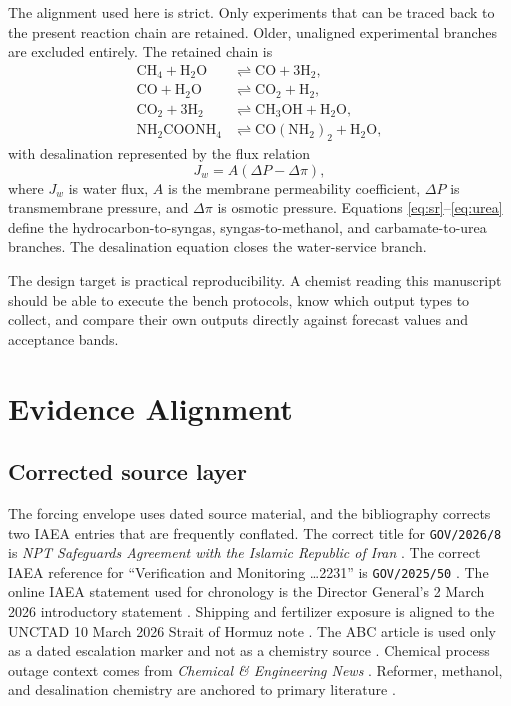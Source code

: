 \documentclass[11pt]{article}
\begin{document}
The alignment used here is strict. Only experiments that can be traced back to the present reaction chain are retained. Older, unaligned experimental branches are excluded entirely. The retained chain is
\begin{align}
\mathrm{CH_4 + H_2O} &\rightleftharpoons \mathrm{CO + 3H_2}, \label{eq:sr}\\
\mathrm{CO + H_2O} &\rightleftharpoons \mathrm{CO_2 + H_2}, \label{eq:wgs}\\
\mathrm{CO_2 + 3H_2} &\rightleftharpoons \mathrm{CH_3OH + H_2O}, \label{eq:meoh}\\
\mathrm{NH_2COONH_4} &\rightleftharpoons \mathrm{CO(NH_2)_2 + H_2O}, \label{eq:urea}
\end{align}
with desalination represented by the flux relation
\begin{equation}
J_w = A(\Delta P - \Delta \pi),
\end{equation}
where \(J_w\) is water flux, \(A\) is the membrane permeability coefficient, \(\Delta P\) is transmembrane pressure, and \(\Delta \pi\) is osmotic pressure. Equations \eqref{eq:sr}--\eqref{eq:urea} define the hydrocarbon-to-syngas, syngas-to-methanol, and carbamate-to-urea branches. The desalination equation closes the water-service branch.

The design target is practical reproducibility. A chemist reading this manuscript should be able to execute the bench protocols, know which output types to collect, and compare their own outputs directly against forecast values and acceptance bands.

\section{Evidence Alignment}

\subsection{Corrected source layer}

The forcing envelope uses dated source material, and the bibliography corrects two IAEA entries that are frequently conflated. The correct title for \texttt{GOV/2026/8} is \emph{NPT Safeguards Agreement with the Islamic Republic of Iran} \cite{IAEA2026NPT}. The correct IAEA reference for ``Verification and Monitoring \ldots 2231'' is \texttt{GOV/2025/50} \cite{IAEA2025VM}. The online IAEA statement used for chronology is the Director General's 2 March 2026 introductory statement \cite{IAEAStatement2026}. Shipping and fertilizer exposure is aligned to the UNCTAD 10 March 2026 Strait of Hormuz note \cite{UNCTAD2026}. The ABC article is used only as a dated escalation marker and not as a chemistry source \cite{ABC2026}. Chemical process outage context comes from \emph{Chemical \& Engineering News} \cite{CEN2026}. Reformer, methanol, and desalination chemistry are anchored to primary literature \cite{Xu1989,VandenBussche1996,Elimelech2011}.
\end{document}
